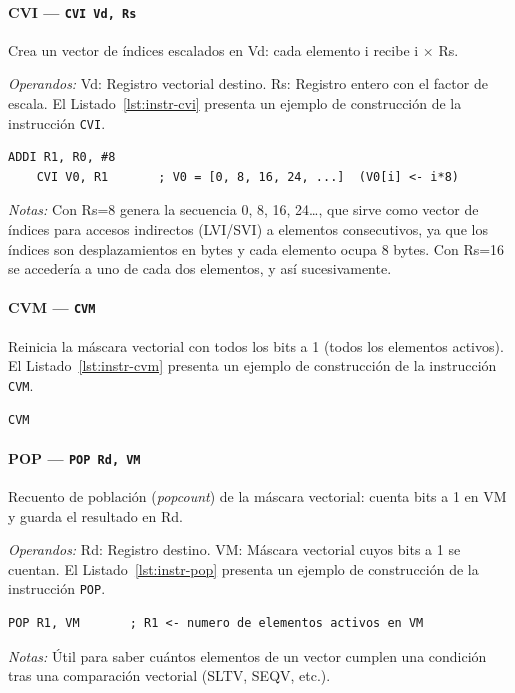 \documentclass[../main.tex]{subfiles}
\begin{document}
\paragraph*{CVI --- \texttt{CVI Vd, Rs}}
Crea un vector de índices escalados en Vd: cada elemento i recibe i $\times$ Rs.

\textit{Operandos:} Vd: Registro vectorial destino. Rs: Registro entero con el factor de escala.
El Listado~\ref{lst:instr-cvi} presenta un ejemplo de construcción de la instrucción \texttt{CVI}.

\begin{lstlisting}[caption={CVI},label={lst:instr-cvi}]
	ADDI R1, R0, #8
	CVI V0, R1       ; V0 = [0, 8, 16, 24, ...]  (V0[i] <- i*8)
\end{lstlisting}
\textit{Notas:} Con Rs=8 genera la secuencia 0, 8, 16, 24\ldots, que sirve como vector de índices para accesos indirectos (LVI/SVI) a elementos consecutivos, ya que los índices son desplazamientos en bytes y cada elemento ocupa 8 bytes. Con Rs=16 se accedería a uno de cada dos elementos, y así sucesivamente.

\paragraph*{CVM --- \texttt{CVM}}
Reinicia la máscara vectorial con todos los bits a 1 (todos los elementos activos).
El Listado~\ref{lst:instr-cvm} presenta un ejemplo de construcción de la instrucción \texttt{CVM}.

\begin{lstlisting}[caption={CVM},label={lst:instr-cvm}]
	CVM
\end{lstlisting}

\paragraph*{POP --- \texttt{POP Rd, VM}}
Recuento de población (\textit{popcount}) de la máscara vectorial: cuenta bits a 1 en VM y guarda el resultado en Rd.

\textit{Operandos:} Rd: Registro destino. VM: Máscara vectorial cuyos bits a 1 se cuentan.
El Listado~\ref{lst:instr-pop} presenta un ejemplo de construcción de la instrucción \texttt{POP}.

\begin{lstlisting}[caption={POP},label={lst:instr-pop}]
	POP R1, VM       ; R1 <- numero de elementos activos en VM
\end{lstlisting}
\textit{Notas:} Útil para saber cuántos elementos de un vector cumplen una condición tras una comparación vectorial (SLTV, SEQV, etc.).
\end{document}
